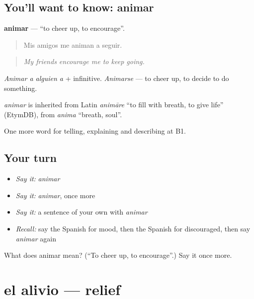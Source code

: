\subsection*{You'll want to know: animar}
\textbf{animar} — \textquotedblleft{}to cheer up, to encourage\textquotedblright{}.

\begin{quote}
Mis amigos me animan a seguir.
\end{quote}

\begin{quote}
\emph{My friends encourage me to keep going.}
\end{quote}

\emph{Animar a alguien a} + infinitive. \emph{Animarse} — to cheer up, to decide to do something.

\begin{cousinweb}
\emph{animar} is inherited from Latin \emph{animāre} \textquotedblleft{}to fill with breath, to give life\textquotedblright{} (EtymDB), from \emph{anima} \textquotedblleft{}breath, soul\textquotedblright{}.
\end{cousinweb}

\begin{grammarlens}[title={What you've built}]
One more word for telling, explaining and describing at B1.
\end{grammarlens}

\subsection*{Your turn}
\begin{itemize}
\raggedright
  \item \emph{Say it:} \emph{animar}
  \item \emph{Say it:} \emph{animar}, once more
  \item \emph{Say it:} a sentence of your own with \emph{animar}
  \item \emph{Recall:} say the Spanish for mood, then the Spanish for discouraged, then say \emph{animar} again
\end{itemize}

\begin{tcolorbox}[breakable,colback=teal!4,colframe=teal!35!black,title={Before you move on}]
What does animar mean? (\textquotedblleft{}To cheer up, to encourage\textquotedblright{}.) Say it once more.
\end{tcolorbox}
\section[el alivio]{el alivio — relief}

